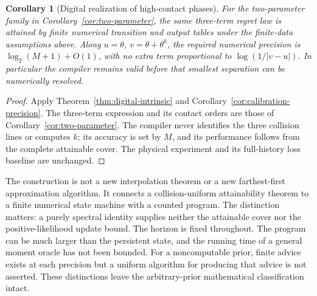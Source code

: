 \documentclass[11pt]{amsart}
\newtheorem{corollary}[theorem]{Corollary}
\theoremstyle{definition}\newtheorem{definition}[theorem]{Definition}
\theoremstyle{remark}\newtheorem{remark}[theorem]{Remark}
\begin{document}
\begin{corollary}[Digital realization of high-contact phases]
\label{cor:digital-contact}
For the two-parameter family in Corollary~\ref{cor:two-parameter}, the
same three-term regret law is attained by finite numerical transition
and output tables under the finite-data assumptions above. Along
$u=\theta$, $v=\theta+\theta^k$, the required numerical precision is
$\log_2(M+1)+O(1)$, with no extra term proportional to
$\log(1/|v-u|)$. In particular the compiler remains valid before that
smallest separation can be numerically resolved.
\end{corollary}
\begin{proof}
Apply Theorem~\ref{thm:digital-intrinsic} and
Corollary~\ref{cor:calibration-precision}. The three-term expression and
its contact orders are those of Corollary~\ref{cor:two-parameter}.
The compiler never identifies the three collision lines or computes
$k$; its accuracy is set by $M$, and its performance follows from the
complete attainable cover. The physical experiment and its full-history
loss baseline are unchanged.
\end{proof}

The construction is not a new interpolation theorem or a new
farthest-first approximation algorithm. It connects a collision-uniform
attainability theorem to a finite numerical state machine with a counted
program. The distinction matters: a purely spectral identity supplies
neither the attainable cover nor the positive-likelihood update bound.
The horizon is fixed throughout. The program can be much larger than
the persistent state, and the running time of a general moment oracle
has not been bounded. For a noncomputable prior, finite advice exists
at each precision but a uniform algorithm for producing that advice is
not asserted. These distinctions leave the arbitrary-prior mathematical
classification intact.
\end{document}
